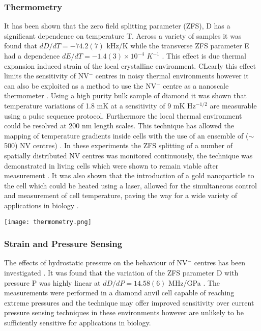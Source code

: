 \documentclass[10pt]{article}
\newenvironment{Figure}
  {\par\medskip\noindent\minipage{\linewidth}}
  {\endminipage\par\medskip}
\begin{document}
\begin{multicols}{2}
\subsubsection{Thermometry} 
It has been shown \cite{acosta2010temperature} that the zero {}field splitting parameter (ZFS), D has a significant dependence on temperature T. Across a variety of samples it was found that $dD/dT = -74.2(7)$ kHz/K while the transverse ZFS parameter E had a dependence $dE/dT = -1.4(3)\times10^{-4}$ $K^{-1}$ \cite{acosta2010temperature}. This effect is due thermal expansion induced strain of the local crystalline environment. CLearly this effect limits the sensitivity of NV$^-$ centres in noisy thermal environments however it can also be exploited as a method to use the NV$^-$ centre as a nanoscale thermometer \cite{toyli2013fluorescence,neumann2013high,kucsko2013nanometre}. Using a high purity bulk sample of diamond it was shown \cite{kucsko2013nanometre} that temperature variations of 1.8 mK at a sensitivity of 9 mK Hz$^{-1/2}$ are measurable using a pulse sequence protocol. Furthermore the local thermal environment could be resolved at 200 nm length scales. This technique has allowed the mapping of temperature gradients inside cells with the use of an ensemble of ($\sim$500) NV centres) \cite{kucsko2013nanometre}. In these experiments the ZFS splitting of a number of spatially distributed NV centres was monitored continuously, the technique was demonstrated in living cells which were shown to remain viable after measurement \cite{kucsko2013nanometre}. It was also shown that the introduction of a gold nanoparticle to the cell which could be heated using a laser, allowed for the simultaneous control and measurement of cell temperature, paving the way for a wide variety of applications in biology \cite{kucsko2013nanometre}.

\begin{Figure}
  \texttt{[image: thermometry.png]}
  \label{fig:energy_level}
\end{Figure}


\subsubsection{Strain and Pressure Sensing}
The effects of hydrostatic pressure on the behaviour of NV$^-$ centres has been investigated \cite{doherty2014electronic}. It was found that the variation of the ZFS parameter D with pressure P was highly linear at $dD/dP = 14.58(6)$ MHz/GPa \cite{doherty2014electronic}. The measurements were performed in a diamond anvil cell capable of reaching extreme pressures and the technique may offer improved sensitivity over current pressure sensing techniques in these environments \cite{doherty2014electronic} however are unlikely to be sufficiently sensitive for applications in biology. 


\end{multicols}
\end{document}
